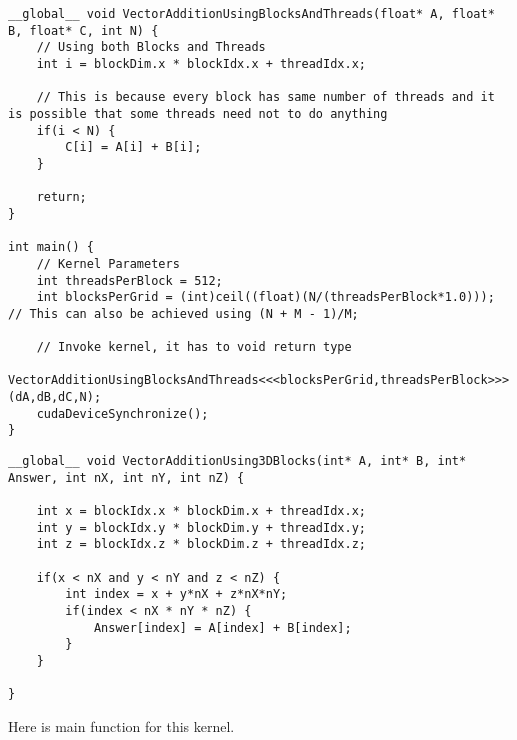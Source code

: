 \begin{lstlisting}
__global__ void VectorAdditionUsingBlocksAndThreads(float* A, float* B, float* C, int N) {
    // Using both Blocks and Threads
    int i = blockDim.x * blockIdx.x + threadIdx.x;
    
    // This is because every block has same number of threads and it is possible that some threads need not to do anything
    if(i < N) {
        C[i] = A[i] + B[i];
    }

    return;
}

int main() {
    // Kernel Parameters
    int threadsPerBlock = 512;
    int blocksPerGrid = (int)ceil((float)(N/(threadsPerBlock*1.0))); // This can also be achieved using (N + M - 1)/M;

    // Invoke kernel, it has to void return type
    VectorAdditionUsingBlocksAndThreads<<<blocksPerGrid,threadsPerBlock>>> (dA,dB,dC,N);
    cudaDeviceSynchronize(); 
}
\end{lstlisting}


\begin{lstlisting}
__global__ void VectorAdditionUsing3DBlocks(int* A, int* B, int* Answer, int nX, int nY, int nZ) {
    
    int x = blockIdx.x * blockDim.x + threadIdx.x;
    int y = blockIdx.y * blockDim.y + threadIdx.y;
    int z = blockIdx.z * blockDim.z + threadIdx.z;

    if(x < nX and y < nY and z < nZ) {
        int index = x + y*nX + z*nX*nY;
        if(index < nX * nY * nZ) {
            Answer[index] = A[index] + B[index];
        }
    }

}
\end{lstlisting}

Here is main function for this kernel.


